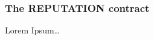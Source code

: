 \documentclass[submission, copyright,creativecommons,sharealike,noncommercial]{eptcs}
\newcommand{\Reputation}{\textbf{REPUTATION}\xspace}
\begin{document}
\subsubsection{The \Reputation contract}
Lorem Ipsum\dots
%
%	
%		
%			
%			
%			
%		
%				
%				
\end{document}
